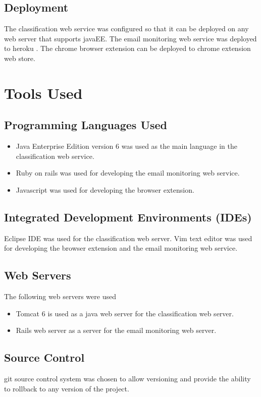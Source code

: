 \subsection{Deployment}
The classification web service was configured so that it can be deployed on any web server that supports javaEE.
The email monitoring web service was deployed to heroku \cite{HEROKU}.
The chrome browser extension can be deployed to chrome extension web store.

\section{Tools Used}

\subsection{Programming Languages Used}
\begin{itemize}
\item Java Enterprise Edition version 6 was used as the main language in the classification web service.
\item Ruby on rails \cite{ROR} was used for developing the email monitoring web service.
\item Javascript was used for developing the browser extension.
\end{itemize}

\subsection{Integrated Development Environments (IDEs)}
Eclipse IDE was used for the classification web server.
Vim text editor was used for developing the browser extension and the email monitoring web service.
\subsection{Web Servers}
The following web servers were used
\begin{itemize}
\item Tomcat 6 is used as a java web server for the classification web server.
\item Rails web server as a server for the email monitoring web server.
\end{itemize}

\subsection{Source Control}
git source control system \cite{GIT} was chosen to allow versioning and provide the ability to rollback to any version of the project.
